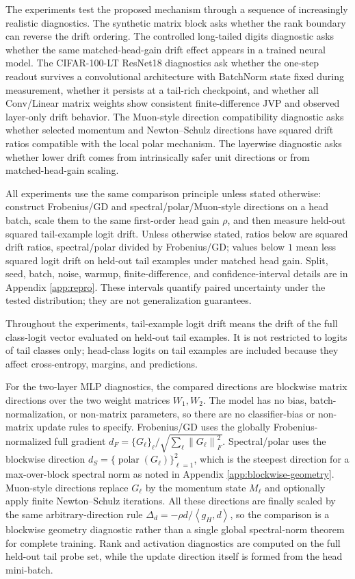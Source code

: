 \documentclass{article}
\theoremstyle{definition}
\newcommand{\norm}[1]{\left\lVert #1 \right\rVert}
\newcommand{\inner}[2]{\left\langle #1,#2 \right\rangle}
\newcommand{\polar}{\operatorname{polar}}
\begin{document}
The experiments test the proposed mechanism through a sequence of increasingly realistic diagnostics. The synthetic matrix block asks whether the rank boundary can reverse the drift ordering. The controlled long-tailed digits diagnostic asks whether the same matched-head-gain drift effect appears in a trained neural model. The CIFAR-100-LT ResNet18 diagnostics ask whether the one-step readout survives a convolutional architecture with BatchNorm state fixed during measurement, whether it persists at a tail-rich checkpoint, and whether all Conv/Linear matrix weights show consistent finite-difference JVP and observed layer-only drift behavior. The Muon-style direction compatibility diagnostic asks whether selected momentum and Newton--Schulz directions have squared drift ratios compatible with the local polar mechanism. The layerwise diagnostic asks whether lower drift comes from intrinsically safer unit directions or from matched-head-gain scaling.

All experiments use the same comparison principle unless stated otherwise: construct Frobenius/GD and spectral/polar/Muon-style directions on a head batch, scale them to the same first-order head gain \(\rho\), and then measure held-out squared tail-example logit drift. Unless otherwise stated, ratios below are squared drift ratios, spectral/polar divided by Frobenius/GD; values below \(1\) mean less squared logit drift on held-out tail examples under matched head gain. Split, seed, batch, noise, warmup, finite-difference, and confidence-interval details are in Appendix \ref{app:repro}. These intervals quantify paired uncertainty under the tested distribution; they are not generalization guarantees.

Throughout the experiments, tail-example logit drift means the drift of the full class-logit vector evaluated on held-out tail examples. It is not restricted to logits of tail classes only; head-class logits on tail examples are included because they affect cross-entropy, margins, and predictions.

For the two-layer MLP diagnostics, the compared directions are blockwise matrix directions over the two weight matrices \(W_1,W_2\). The model has no bias, batch-normalization, or non-matrix parameters, so there are no classifier-bias or non-matrix update rules to specify. Frobenius/GD uses the globally Frobenius-normalized full gradient \(d_F=\{G_\ell\}_\ell/\sqrt{\sum_\ell\norm{G_\ell}_F^2}\). Spectral/polar uses the blockwise direction \(d_S=\{\polar(G_\ell)\}_{\ell=1}^2\), which is the steepest direction for a max-over-block spectral norm as noted in Appendix \ref{app:blockwise-geometry}. Muon-style directions replace \(G_\ell\) by the momentum state \(M_\ell\) and optionally apply finite Newton--Schulz iterations. All these directions are finally scaled by the same arbitrary-direction rule \(\Delta_d=-\rho d/\inner{g_H}{d}\), so the comparison is a blockwise geometry diagnostic rather than a single global spectral-norm theorem for complete training. Rank and activation diagnostics are computed on the full held-out tail probe set, while the update direction itself is formed from the head mini-batch.
\end{document}
